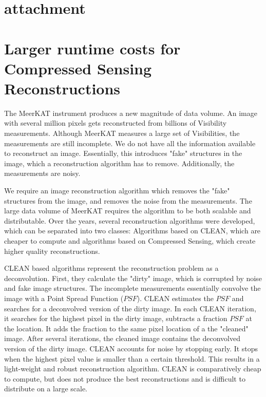 \pagebreak
\section{attachment}
\pagebreak

\section{Larger runtime costs for Compressed Sensing Reconstructions}\label{hypo}
The MeerKAT instrument produces a new magnitude of data volume. An image with several million pixels gets reconstructed from billions of Visibility measurements. Although MeerKAT measures a large set of Visibilities, the measurements are still incomplete. We do not have all the information available to reconstruct an image. Essentially, this introduces "fake" structures in the image, which a reconstruction algorithm has to remove. Additionally, the measurements are noisy.

We require an image reconstruction algorithm which removes the "fake" structures from the image, and removes the noise from the measurements. The large data volume of MeerKAT requires the algorithm to be both scalable and distributable. Over the years, several reconstruction algorithms were developed, which can be separated into two classes: Algorithms based on CLEAN, which are cheaper to compute and algorithms based on Compressed Sensing, which create higher quality reconstructions.

CLEAN based algorithms represent the reconstruction problem as a deconvolution. First, they calculate the "dirty" image, which is corrupted by noise and fake image structures. The incomplete measurements essentially convolve the image with a Point Spread Function ($PSF$). CLEAN estimates the $PSF$ and searches for a deconvolved version of the dirty image. In each CLEAN iteration, it searches for the highest pixel in the dirty image, subtracts a fraction $PSF$ at the location. It adds the fraction to the same pixel location of a the "cleaned" image. After several iterations, the cleaned image contains the deconvolved version of the dirty image. CLEAN accounts for noise by stopping early. It stops when the highest pixel value is smaller than a certain threshold. This results in a light-weight and robust reconstruction algorithm. CLEAN is comparatively cheap to compute, but does not produce the best reconstructions and is difficult to distribute on a large scale.

